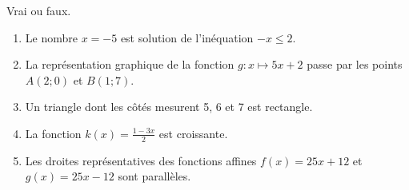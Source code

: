 
\begin{exercice}\label{exosmath-0522}

    Vrai ou faux.
    \begin{enumerate}
        \item
            Le nombre \( x=-5\) est solution de l'inéquation \( -x\leq 2\).
        \item
            La représentation graphique de la fonction \( g\colon x\mapsto 5x+2\) passe par les points \( A(2;0)\) et \( B(1;7)\).
        \item
            Un triangle dont les côtés mesurent \unit{5}{\kilo\meter}, \unit{6}{\kilo\meter} et \unit{7}{\kilo\meter} est rectangle.
        \item
            La fonction \( k(x)=\frac{ 1-3x }{2}\) est croissante.
        \item
            Les droites représentatives des fonctions affines \( f(x)=25x+12\) et \( g(x)=25x-12\) sont parallèles.
    \end{enumerate}

\end{exercice}
